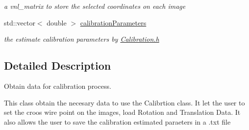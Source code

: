 \begin{DoxyCompactItemize}
\begin{DoxyCompactList}\small\item\em a vnl\-\_\-matrix to store the selected coordinates on each image \end{DoxyCompactList}\item 
std\-::vector$<$ double $>$ \hyperlink{class_probe_calibration_widget_a12ff40e5b49bfb1f10e81e28a9b03e07}{calibration\-Parameters}
\begin{DoxyCompactList}\small\item\em the estimate calibration parameters by \hyperlink{_calibration_8h}{Calibration.\-h} \end{DoxyCompactList}\end{DoxyCompactItemize}


\subsection{Detailed Description}
Obtain data for calibration process. 

This class obtain the necesary data to use the Calibrtion class. It let the user to set the croos wire point on the images, load Rotation and Translation Data. It also allows the user to save the calibration estimated paraeters in a .txt file 

